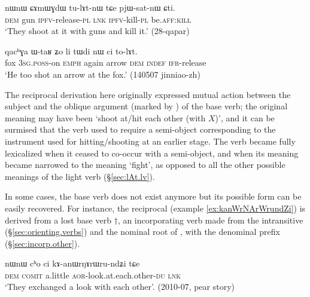 \begin{exe}
\ex \label{ex:CAmWGdW.tulAtnW}
\gll nɯnɯ ɕɤmɯɣdɯ tu-lɤt-nɯ tɕe pjɯ-sat-nɯ ɕti. \\
\textsc{dem} gun \textsc{ipfv}-release-\textsc{pl} \textsc{lnk} \textsc{ipfv}-kill-\textsc{pl} be.\textsc{aff}:\textsc{kill} \\
\glt `They shoot at it with guns and kill it.' (28-qapar)
\end{exe}

\begin{exe}
\ex \label{ex:qachGa.WtaR.tWdi.tolAt}
\gll qacʰɣa ɯ-taʁ ʑo li tɯdi nɯ ci to-lɤt. \\
fox \textsc{3sg}.\textsc{poss}-on \textsc{emph} again arrow \textsc{dem} \textsc{indef} \textsc{ifr}-release \\
\glt `He too shot an arrow at the fox.' (140507 jinniao-zh)
\end{exe}

The reciprocal derivation here originally expressed mutual action between the subject and the oblique argument (marked by ) of the base verb; the original meaning may have been `shoot at/hit each other (with $X$)', and it can be surmised that the verb  used to require a semi-object corresponding to the instrument used for hitting/shooting at an earlier stage. The verb  became fully lexicalized when it ceased to co-occur with a semi-object, and when its meaning became narrowed to the meaning `fight', as opposed to all the other possible meanings of the light verb  (§\ref{sec:lAt.lv}).
 
In some cases, the base verb does not exist anymore but its possible form can be easily recovered. For instance, the reciprocal  (example \ref{ex:kanWrNArWrundZi}) is derived from a lost base verb $\dagger$, an incorporating verb made from the intransitive  (§\ref{sec:orienting.verbs})  and the nominal root of , with the denominal prefix  (§\ref{sec:incorp.other}).

\begin{exe}
\ex \label{ex:kanWrNArWrundZi}
\gll   nɯnɯ cʰo ci kɤ-anɯrŋɤrɯru-ndʑi tɕe \\
\textsc{dem} \textsc{comit} a.little \textsc{aor}-look.at.each.other-\textsc{du} \textsc{lnk} \\
\glt  `They exchanged a look with each other'. (2010-07, pear story)
\end{exe}


